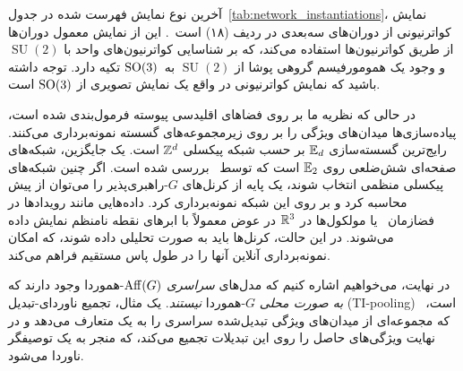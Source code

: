 آخرین نوع نمایش فهرست شده در جدول~\ref{tab:network_instantiations}، نمایش کواترنیونی از دوران‌های سه‌بعدی در ردیف (۱۸) است~\cite{zhang2019quaternion}.
این از نمایش معمول دوران‌ها از طریق کواترنیون‌ها استفاده می‌کند، که بر شناسایی کواترنیون‌های واحد با $\operatorname{SU}(2)$ و وجود یک همومورفیسم گروهی پوشا از $\operatorname{SU}(2)$ به~$\operatorname{SO}(3)$ تکیه دارد.
توجه داشته باشید که نمایش کواترنیونی در واقع یک نمایش تصویری از $\operatorname{SO}(3)$ است.


در حالی که نظریه ما بر روی فضاهای اقلیدسی پیوسته فرمول‌بندی شده است، پیاده‌سازی‌ها میدان‌های ویژگی را بر روی زیرمجموعه‌های گسسته نمونه‌برداری می‌کنند.
رایج‌ترین گسسته‌سازی $\mathbb{E}_d$ بر حسب شبکه پیکسلی $\mathbb{Z}^d$ است.
یک جایگزین، شبکه‌های صفحه‌ای شش‌ضلعی روی $\mathbb{E}_2$ است که توسط~\citet{Hoogeboom2018-HEX} بررسی شده است.
اگر چنین شبکه‌های پیکسلی منظمی انتخاب شوند، یک پایه از کرنل‌های $G$-راهبری‌پذیر را می‌توان از پیش محاسبه کرد و بر روی این شبکه نمونه‌برداری کرد.
داده‌هایی مانند رویدادها در فضازمان~\cite{shutty2020learning} یا مولکول‌ها در $\mathbb{R}^3$ \cite{Thomas2018-TFN,Kondor2018-NBN,anderson2019cormorant,miller2020relevance} در عوض معمولاً با ابرهای نقطه نامنظم نمایش داده می‌شوند.
در این حالت، کرنل‌ها باید به صورت تحلیلی داده شوند، که امکان نمونه‌برداری آنلاین آنها را در طول پاس مستقیم فراهم می‌کند.


در نهایت، می‌خواهیم اشاره کنیم که مدل‌های \emph{سراسری} $\operatorname{Aff}(G)$-هموردا وجود دارند که \emph{به صورت محلی} $G$-هموردا \emph{نیستند}.
یک مثال، تجمیع ناوردای-تبدیل (TI-pooling)~\cite{Laptev_2016_CVPR} است، که مجموعه‌ای از میدان‌های ویژگی تبدیل‌شده سراسری را به یک  متعارف می‌دهد و در نهایت ویژگی‌های حاصل را روی این تبدیلات تجمیع می‌کند، که منجر به یک توصیفگر ناوردا می‌شود.